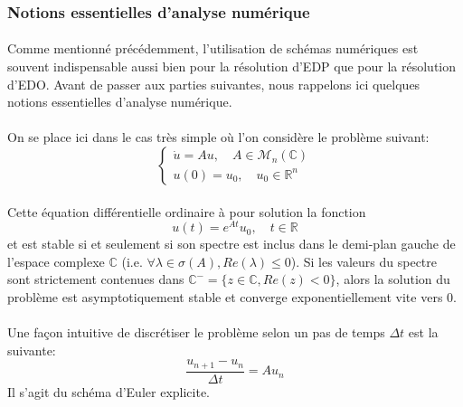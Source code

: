     \subsubsection{Notions essentielles d'analyse numérique}
        \paragraph{}
        Comme mentionné précédemment, l'utilisation de schémas numériques est souvent indispensable aussi bien pour la résolution d'EDP que pour la résolution d'EDO. Avant de passer aux parties suivantes, nous rappelons ici quelques notions essentielles d'analyse numérique.

        \paragraph{}
        On se place ici dans le cas très simple où l'on considère le problème suivant:
        \begin{equation}
            \left\{\begin{aligned}
                \dot{u} = A u, \quad  A \in \mathcal{M}_n(\mathbb{C})\\
                u(0) = u_0, \quad u_0 \in \mathbb{R}^n
            \end{aligned}\right.
            \label{eq:lin}
        \end{equation}

        \paragraph{}
        Cette équation différentielle ordinaire à pour solution la fonction $$u(t) = e^{A t}u_0, \quad t\in \mathbb{R}$$ et est stable si et seulement si son spectre est inclus dans le demi-plan gauche de l'espace complexe $\mathbb{C}$ (i.e. $\forall \lambda \in \sigma(A), Re (\lambda) \leq 0$). Si les valeurs du spectre sont strictement contenues dans $\mathbb{C}^- = \{z\in \mathbb{C}, Re(z)<0\}$, alors la solution du problème est asymptotiquement stable et converge exponentiellement vite vers $0$.

        \paragraph{}
        Une façon intuitive de discrétiser le problème selon un pas de temps $\Delta t$ est la suivante:
        \begin{equation}
            \frac{u_{n+1}-u_n}{\Delta t} = A u_n 
            \label{eq:Euler}
        \end{equation}
        Il s'agit du schéma d'Euler explicite.

